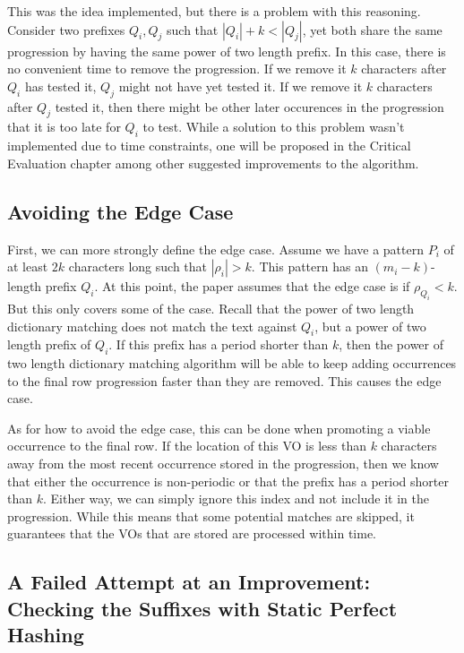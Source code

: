 \documentclass[ %
                    author={Dominic Joseph Moylett},
                    degree={MEng},
                     title={Dictionary Matching with Fingerprints},
                  subtitle={An Empirical Analysis},
                      type={research},
                      year={2015} ]{dissertation}
\begin{document}
This was the idea implemented, but there is a problem with this reasoning. Consider two prefixes $Q_i, Q_j$ such that $|Q_i| + k < |Q_j|$, yet both share the same progression by having the same power of two length prefix. In this case, there is no convenient time to remove the progression. If we remove it $k$ characters after $Q_i$ has tested it, $Q_j$ might not have yet tested it. If we remove it $k$ characters after $Q_j$ tested it, then there might be other later occurences in the progression that it is too late for $Q_i$ to test. While a solution to this problem wasn't implemented due to time constraints, one will be proposed in the Critical Evaluation chapter among other suggested improvements to the algorithm.

\subsection{Avoiding the Edge Case}
\label{ssec:impl-edge-case}

First, we can more strongly define the edge case. Assume we have a pattern $P_i$ of at least $2k$ characters long such that $|\rho_i| > k$. This pattern has an $(m_i - k)$-length prefix $Q_i$. At this point, the paper assumes that the edge case is if $\rho_{Q_i} < k$. But this only covers some of the case. Recall that the power of two length dictionary matching does not match the text against $Q_i$, but a power of two length prefix of $Q_i$. If this prefix has a period shorter than $k$, then the power of two length dictionary matching algorithm will be able to keep adding occurrences to the final row progression faster than they are removed. This causes the edge case.

As for how to avoid the edge case, this can be done when promoting a viable occurrence to the final row. If the location of this VO is less than $k$ characters away from the most recent occurrence stored in the progression, then we know that either the occurrence is non-periodic or that the prefix has a period shorter than $k$. Either way, we can simply ignore this index and not include it in the progression. While this means that some potential matches are skipped, it guarantees that the VOs that are stored are processed within time.

\subsection{A Failed Attempt at an Improvement: Checking the Suffixes with Static Perfect Hashing}
\label{ssec:static-hash-fail}
\end{document}
